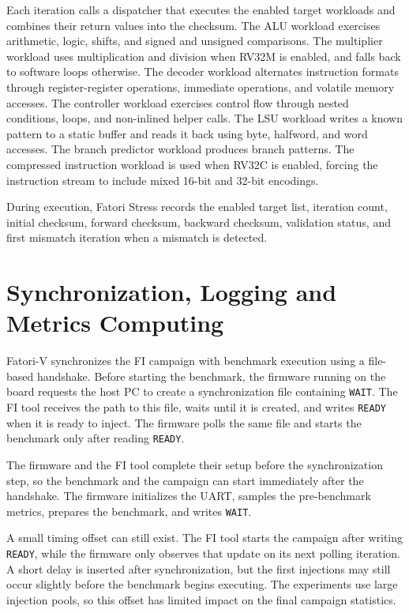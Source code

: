 Each iteration calls a dispatcher that executes the enabled target workloads and combines their return values into the checksum. The \ac{ALU} workload exercises arithmetic, logic, shifts, and signed and unsigned comparisons. The multiplier workload uses multiplication and division when RV32M is enabled, and falls back to software loops otherwise. The decoder workload alternates instruction formats through register-register operations, immediate operations, and volatile memory accesses. The controller workload exercises control flow through nested conditions, loops, and non-inlined helper calls. The \ac{LSU} workload writes a known pattern to a static buffer and reads it back using byte, halfword, and word accesses. The branch predictor workload produces branch patterns. The compressed instruction workload is used when RV32C is enabled, forcing the instruction stream to include mixed 16-bit and 32-bit encodings.

During execution, Fatori Stress records the enabled target list, iteration count, initial checksum, forward checksum, backward checksum, validation status, and first mismatch iteration when a mismatch is detected.


\section{Synchronization, Logging and Metrics Computing}
\label{chap7:sw_logging}

\ac{Fatori-V} synchronizes the \ac{FI} campaign with benchmark execution using a file-based handshake. Before starting the benchmark, the firmware running on the board requests the host \ac{PC} to create a synchronization file containing \texttt{WAIT}. The \ac{FI} tool receives the path to this file, waits until it is created, and writes \texttt{READY} when it is ready to inject. The firmware polls the same file and starts the benchmark only after reading \texttt{READY}.

The firmware and the \ac{FI} tool complete their setup before the synchronization step, so the benchmark and the campaign can start immediately after the handshake. The firmware initializes the \ac{UART}, samples the pre-benchmark metrics, prepares the benchmark, and writes \texttt{WAIT}.

A small timing offset can still exist. The \ac{FI} tool starts the campaign after writing \texttt{READY}, while the firmware only observes that update on its next polling iteration. A short delay is inserted after synchronization, but the first injections may still occur slightly before the benchmark begins executing. The experiments use large injection pools, so this offset has limited impact on the final campaign statistics.

